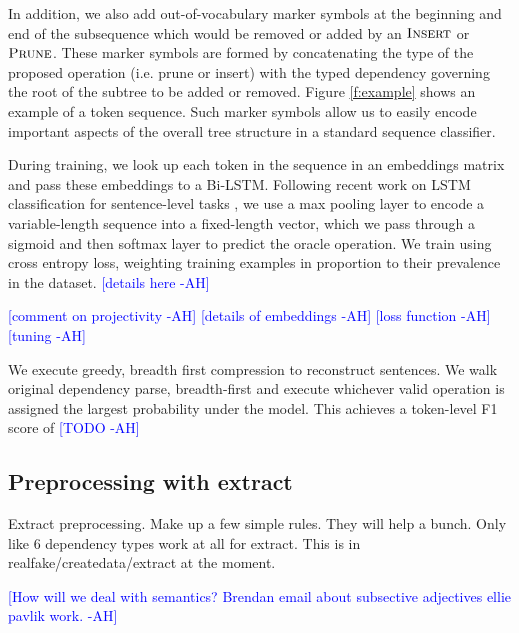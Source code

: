 \documentclass[11pt,a4paper]{article}
\newcommand{\ahcomment}[1]{\textcolor{blue}{[#1 -AH]}}
\begin{document}
In addition, we also add out-of-vocabulary marker symbols at the beginning and end of the subsequence which would be removed or added by an $\textsc{Insert}$ or $\textsc{Prune}$. These marker symbols are formed by concatenating the type of the proposed operation (i.e. prune or insert) with the typed dependency governing the root of the subtree to be added or removed. Figure \ref{f:example} shows an example of a token sequence. Such marker symbols allow us to easily encode important aspects of the overall tree structure in a standard sequence classifier. 

During training, we look up each token in the sequence in an embeddings matrix and pass these embeddings to a Bi-LSTM. Following recent work on LSTM classification for sentence-level tasks \cite{D17-1070}, we use a max pooling layer to encode a variable-length sequence into a fixed-length vector, which we pass through a sigmoid and then softmax layer to predict the oracle operation. We train using cross entropy loss, weighting training examples in proportion to their prevalence in the dataset. \ahcomment{details here}

\ahcomment{comment on projectivity}
\ahcomment{details of embeddings}
\ahcomment{loss function}
\ahcomment{tuning}

We execute greedy, breadth first compression to reconstruct sentences. We walk original dependency parse, breadth-first and execute whichever valid operation is assigned the largest probability under the model. This achieves a token-level F1 score of \ahcomment{TODO}

\subsection{Preprocessing with extract}
Extract preprocessing. Make up a few simple rules. They will help a bunch. Only like 6 dependency types work at all for extract. This is in realfake/createdata/extract at the moment.



\ahcomment{How will we deal with semantics? Brendan email about subsective adjectives ellie pavlik work. }
\end{document}
